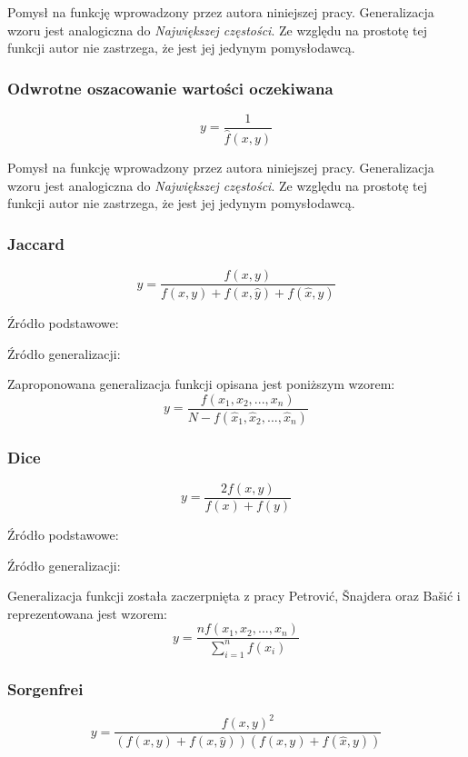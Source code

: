 \par
Pomysł na funkcję wprowadzony przez autora niniejszej pracy.
Generalizacja wzoru jest analogiczna do \emph{Największej częstości}.
Ze względu na prostotę tej funkcji autor nie zastrzega, że jest jej jedynym pomysłodawcą.

\subsubsection{Odwrotne oszacowanie wartości oczekiwana}
$$ y = \frac{1}{\hat{f}(x, y)} $$

\par
Pomysł na funkcję wprowadzony przez autora niniejszej pracy.
Generalizacja wzoru jest analogiczna do \emph{Największej częstości}.
Ze względu na prostotę tej funkcji autor nie zastrzega, że jest jej jedynym pomysłodawcą.

\subsubsection{Jaccard}
$$ y = \frac{f(x, y)}{f(x, y) + f(x, \hat{y}) + f(\hat{x}, y)} $$

Źródło podstawowe: \cite[str. 18]{pecina_measures}
\par
Źródło generalizacji: \cite{generalization_patterns}
\par
Zaproponowana generalizacja funkcji opisana jest poniższym wzorem:
$$ y = \frac{f(x_{1}, x_{2}, ..., x_{n})}{N - f(\hat{x}_{1}, \hat{x}_{2}, ..., \hat{x}_{n})} $$

\subsubsection{Dice}
$$ y = \frac{2f(x, y)}{f(x) + f(y)} $$

Źródło podstawowe: \cite[str. 18]{pecina_measures}
\par
Źródło generalizacji: \cite{generalization_patterns}
\par
Generalizacja funkcji została zaczerpnięta z pracy Petrović, Šnajdera oraz Bašić \cite[str. 2]{generalization_patterns} i reprezentowana jest wzorem:
$$ y = \frac{nf(x_{1}, x_{2}, ..., x_{n})}{\sum_{i = 1}^{n} f(x_{i})} $$

\subsubsection{Sorgenfrei}
$$ y = \frac{f(x, y)^2}{(f(x, y) + f(x, \hat{y}))(f(x, y) + f(\hat{x}, y))} $$

